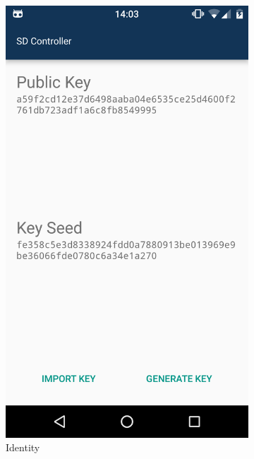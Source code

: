 \begin{figure}
    \centering

    \begin{subfigure}{0.24\textwidth}
        \includegraphics[width=\linewidth]{resources/identity.png}
        \caption{Identity}
        \label{identity}
    \end{subfigure}
    \begin{subfigure}{0.24\textwidth}

\end{subfigure}
\end{figure}
